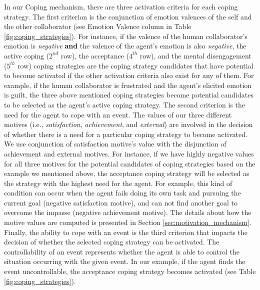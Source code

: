 \documentclass[12pt]{report}
\begin{document}
In our Coping mechanism, there are three activation criteria for each coping
strategy. The first criterion is the conjunction of emotion valences of the self
and the other collaborator (see Emotion Valence column in Table
\ref{fig:coping_strategies}). For instance, if the valence of the human
collaborator's emotion is \textit{negative} \textbf{and} the valence of the
agent's emotion is also \textit{negative}, the active coping ($2^{nd}$ row), the
acceptance ($4^{th}$ row), and the mental disengagement ($5^{th}$ row) coping
strategies are the coping strategy candidates that have potential to become
activated if the other activation criteria also exist for any of them. For
example, if the human collaborator is frustrated and the agent's elicited
emotion is guilt, the three above mentioned coping strategies become potential
candidates to be selected as the agent's active coping strategy. The second
criterion is the need for the agent to cope with an event. The values of our
three different motives (i.e., \textit{satisfaction}, \textit{achievement}, and
\textit{external}) are involved in the decision of whether there is a need for a
particular coping strategy to become activated. We use conjunction of
satisfaction motive's value with the disjunction of achievement and external
motives. For instance, if we have highly negative values for all three motives
for the potential candidates of coping strategies based on the example we
mentioned above, the acceptance coping strategy will be selected as the strategy
with the highest need for the agent. For example, this kind of condition can
occur when the agent fails doing its own task and pursuing the current goal
(negative satisfaction motive), and can not find another goal to overcome the
impasse (negative achievement motive). The details about how the motive values
are computed is presented in Section \ref{sec:motivation_mechanism}. Finally,
the ability to cope with an event is the third criterion that impacts the
decision of whether the selected coping strategy can be activated. The
controllability of an event represents whether the agent is able to control the
situation occurring with the given event. In our example, if the agent finds the
event uncontrollable, the acceptance coping strategy becomes activated (see
Table \ref{fig:coping_strategies}).
\end{document}
